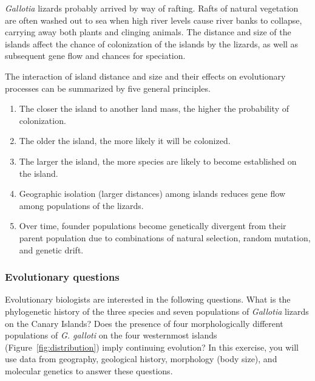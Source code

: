 \documentclass[12pt, hidelinks]{exam}
\begin{document}
\emph{Gallotia} lizards probably arrived by way of rafting. Rafts of natural vegetation are often
washed out to sea when high river levels cause river banks to collapse,
carrying away both plants and clinging animals. The distance and size of the islands affect the chance of colonization of the islands by the lizards, as well as subsequent gene flow and chances for speciation.

The interaction of island distance and size and their effects on evolutionary processes can be summarized by five general principles.


\begin{enumerate}\label{general_principles}

	\item The closer the island to another land mass, the higher the
	probability of colonization.

	\item The older the island, the more likely it will be colonized.
	
	\item The larger the island, the more species are likely to become
	established on the island.

	\item Geographic isolation (larger distances) among islands reduces 
	gene flow among populations of the lizards.
	
	\item Over time, founder populations become genetically divergent from
	their parent population due to combinations of natural selection, random 
	mutation, and genetic drift.

\end{enumerate} 

\subsubsection*{Evolutionary questions}

Evolutionary biologists are interested
in the following questions. What is the phylogenetic history of the three
species and seven populations of \emph{Gallotia} lizards on the Canary
Islands? Does the presence of four morphologically different populations
of \emph{G. galloti} on the four westernmost islands
(Figure~\ref{fig:distribution}) imply continuing evolution? In this
exercise, you will use data from geography, geological history,
morphology (body size), and molecular genetics to answer
these questions.
\end{document}
